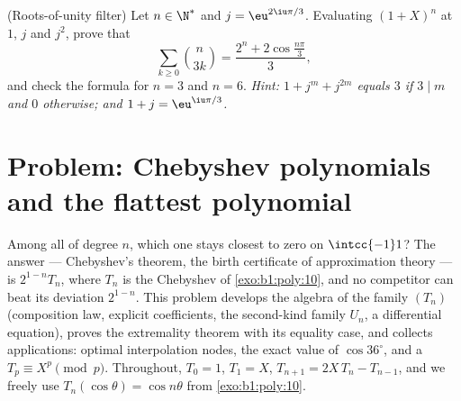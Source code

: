 \begin{exercise}[$\star\star$]\label{exo:b1:poly:12}
(Roots-of-unity filter) Let $n \in \N^*$ and $j = \eu^{2\iu\pi/3}$.
Evaluating $(1 + X)^n$ at $1$, $j$ and $j^2$, prove that
\[
\sum_{k \geq 0} \binom{n}{3k}
= \frac{2^n + 2\cos\frac{n\pi}{3}}{3} ,
\]
and check the formula for $n = 3$ and $n = 6$. \emph{Hint: $1 +
j^m + j^{2m}$ equals $3$ if $3 \mid m$ and $0$ otherwise; and $1 +
j = \eu^{\iu\pi/3}$.}
\end{exercise}

\section{Problem: Chebyshev polynomials and the flattest polynomial}

\begin{problem}\label{pb:b1:poly:1}
Among all \emph{}  of degree $n$, which one stays
closest to zero on $\intcc{-1}1$? The answer --- Chebyshev's
theorem, the birth certificate of approximation theory --- is
$2^{1-n}T_n$, where $T_n$ is the Chebyshev  of
\cref{exo:b1:poly:10}, and no  competitor can beat its
deviation $2^{1-n}$. This problem
develops the algebra of the family $(T_n)$ (composition law,
explicit coefficients, the second-kind family $U_n$, a
differential equation), proves the extremality theorem with its
equality case, and collects applications: optimal interpolation
nodes, the exact value of $\cos 36^\circ$, and a 
$T_p \equiv X^p \pmod p$. Throughout, $T_0 = 1$, $T_1 = X$,
$T_{n+1} = 2X\,T_n - T_{n-1}$, and we freely use
$T_n(\cos\theta) = \cos n\theta$ from \cref{exo:b1:poly:10}.


\end{problem}
